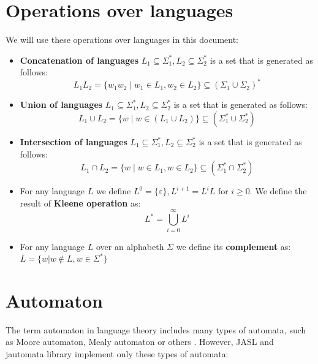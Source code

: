 \documentclass{ctuthesis}
\begin{document}
\section{Operations over languages}
\label{sec:operations-languages-def}
We will use these operations over languages in this document:
\begin{itemize}
	\item \textbf{Concatenation of languages} $L_1 \subseteq \Sigma^*_1, L_2 \subseteq \Sigma^*_2$ is a set that is generated as follows:
	\begin{equation*}
		L_1L_2 = \{w_1w_2 \mid w_1 \in L_1, w_2 \in L_2\} \subseteq (\Sigma_1 \cup \Sigma_2)^*
	\end{equation*}
	
	\item \textbf{Union of languages} $L_1 \subseteq \Sigma^*_1, L_2 \subseteq \Sigma^*_2$ is a set that is generated as follows:
	\begin{equation*}
		L_1\cup L_2 = \{w \mid w \in (L_1 \cup L_2) \} \subseteq (\Sigma_1^* \cup \Sigma_2^*)
	\end{equation*}
	
	\item \textbf{Intersection of languages} $L_1 \subseteq \Sigma^*_1, L_2 \subseteq \Sigma^*_2$ is a set that is generated as follows:
	\begin{equation*}
		L_1 \cap L_2 = \{w \mid w \in L_1, w \in L_2 \} \subseteq (\Sigma^*_1 \cap \Sigma^*_2)
	\end{equation*}
	
	\item For any language $L$ we define $L^0 = \{\varepsilon\}, L^{i+1} = L^iL$ for $i \geq 0$. We define the result of \textbf{Kleene operation} as:
	\begin{equation*}
		L^* = \bigcup^{\infty}_{i=0} L^i
	\end{equation*}
	
	\item For any language $L$ over an alphabeth $\Sigma$ we define its \textbf{complement} as: $\overline{L} = \{w | w \not \in L, w \in \Sigma^*\}$
\end{itemize}

\section{Automaton}
\label{sec:automaton-def}
The term automaton in language theory includes many types of automata, such as Moore automaton, Mealy automaton or others \cite{melichar}. However, JASL and jautomata library implement only these types of automata:
\end{document}
